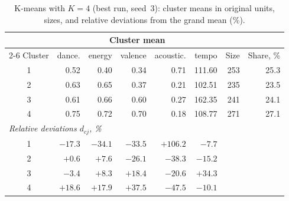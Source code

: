 \documentclass[11pt,letterpaper]{article}
\begin{document}
\begin{table}[H]
\centering
\caption{K-means with $K=4$ (best run, seed~3): cluster means in original
units, sizes, and relative deviations from the grand mean (\%).}
\label{tab:a3k4}
\small
\begin{tabular}{crrrrrrr}
\toprule
 & \multicolumn{5}{c}{Cluster mean} & & \\
\cmidrule(lr){2-6}
Cluster & dance. & energy & valence & acoustic. & tempo & Size & Share, \% \\
\midrule
1 & 0.52 & 0.40 & 0.34 & 0.71 & 111.60 & 253 & 25.3 \\
2 & 0.63 & 0.65 & 0.37 & 0.21 & 102.51 & 235 & 23.5 \\
3 & 0.61 & 0.66 & 0.60 & 0.27 & 162.35 & 241 & 24.1 \\
4 & 0.75 & 0.72 & 0.70 & 0.18 & 108.77 & 271 & 27.1 \\
\midrule
\multicolumn{8}{l}{\textit{Relative deviations $d_{cj}$, \%}} \\
1 & $-17.3$ & $-34.1$ & $-33.5$ & $+106.2$ & $-7.7$  & & \\
2 & $+0.6$   & $+7.6$   & $-26.1$ & $-38.3$  & $-15.2$ & & \\
3 & $-3.4$   & $+8.3$   & $+18.4$ & $-20.6$  & $+34.3$ & & \\
4 & $+18.6$  & $+17.9$  & $+37.5$ & $-47.5$  & $-10.1$ & & \\
\bottomrule
\end{tabular}
\end{table}
\end{document}
